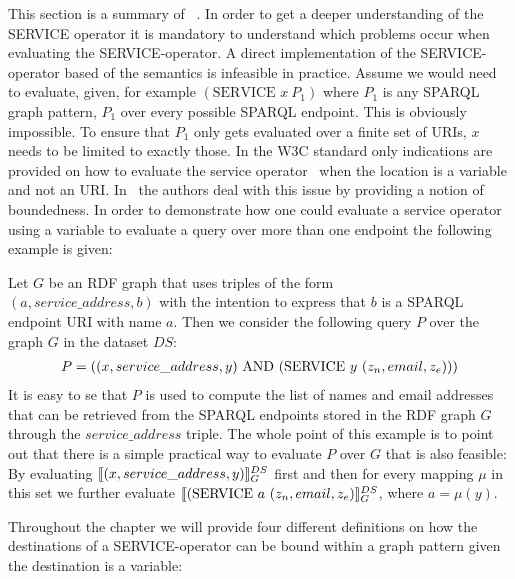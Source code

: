 This section is a summary of ~\cite[p. 4-7]{BuilAranda20131}. In order to get a
deeper understanding of the SERVICE operator it is mandatory to understand which
problems occur when evaluating the SERVICE-operator.
A direct implementation of the SERVICE-operator based of the semantics is
infeasible in practice. Assume we would need to evaluate, given, for example $(\mbox{SERVICE }  x \
P_1)$ where $P_1$ is any SPARQL graph pattern, $P_1$ over every 
possible SPARQL endpoint. This is obviously impossible. To ensure that $P_1$
only gets evaluated over a finite set of URIs, $x$ needs to be limited to exactly
those. In the W3C standard only indications are provided on how to evaluate the
service operator~\cite{w3standardservice} when the location is a variable and
not an URI. In~\cite{BuilAranda20131} the authors deal with this issue by
providing a notion of boundedness. In order to demonstrate how one could
evaluate a service operator using a variable to evaluate a query over more than
one endpoint the following example is given:
\begin{example}
Let $G$ be an RDF graph that uses triples of the form\\ $(a, service\_address,b)$
with the intention to express that $b$ is a SPARQL endpoint URI with name $a$.
Then we consider the following query $P$ over the graph $G$ in the dataset $DS$:
\begin{align*}
	P=((x, service\_address, y) \AND (\mbox{SERVICE } y \ (z_n,email,z_e)))
\end{align*}
It is easy to se that $P$ is used to compute the list of names and email
addresses that can be retrieved from the SPARQL endpoints stored in the RDF
graph $G$ through the $service\_address$ triple. 
The whole point of this example is to point out that there is a simple practical
way to evaluate $P$ over $G$ that is also feasible:
By evaluating $\llbracket (x,service\_address,y) \rrbracket^{DS}_G$ first and then for every
mapping $\mu$ in this set we further evaluate $\llbracket (\mbox{SERVICE } a \ (z_n, email, z_e)
\rrbracket^{DS}_G$, where $a = \mu(y)$. 
\end{example}
Throughout the chapter we will provide four different definitions on how the
destinations of a SERVICE-operator can be bound within a graph pattern given the
destination is a variable:
